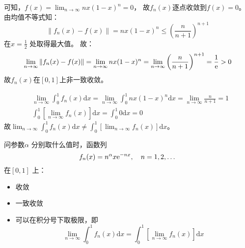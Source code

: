\begin{solution}
    可知，\(f(x) = \lim_{n \to \infty} nx(1-x)^n = 0\)，
    故\(f_{n}(x)\)逐点收敛到\(f(x) = 0\)。
    由均值不等式知： \[
        \left\lVert f_{n}(x) - f(x) \right\rVert =
        nx(1-x)^{n} \le \left( \frac{n}{n + 1} \right)^{n+1}
    \]
    在\(x = \frac{1}{2}\) 处取得最大值。
    故： \[
        \lim_{n \to \infty} \left\lVert f_{n}(x) - f(x) \right\rVert
        = \lim_{n \to \infty} nx(1-x)^{n} = \lim_{n \to \infty}
        \left( \frac{n}{n + 1} \right)^{n+1} = \frac{1}{\mathrm{e}} > 0
    \]
    故\(f_{n}(x)\)在\([0,1]\)上非一致收敛。

    \begin{align*}
        & \lim_{n \to \infty} \int_0^1 f_n(x) \mathrm{d}x
        = \lim_{n \to \infty} \int_0^1 nx(1-x)^n \mathrm{d}x
        = \lim_{n \to \infty} \frac{n}{n+1} = 1
        \\
        & \int_0^1 \left[ \lim_{n \to \infty} f_n(x)
        \right] \mathrm{d}x
        = \int_0^1 0 \mathrm{d}x = 0
    \end{align*}
    故\(\lim_{n \to \infty} \int_0^1 f_n(x) \mathrm{d}x \neq \int_0^1
    \left[\lim_{n \to \infty} f_n(x) \right] \mathrm{d}x\)。
\end{solution}

\begin{problem}
    问参数\(\alpha\) 分别取什么值时，函数列
    \[
        f_n(x) = n^\alpha x\mathrm{e}^{-n x}, \quad n = 1, 2, \dots
    \] 在\([0,1]\) 上：
    \begin{itemize}
        \item 收敛
        \item 一致收敛
        \item 可以在积分号下取极限，即\[
                \lim_{n \to \infty} \int_0^1 f_n(x)
                \mathrm{d}x = \int_0^1
                \left[ \lim_{n \to \infty} f_n(x) \right] \mathrm{d}x
            \]
    \end{itemize}
\end{problem}

